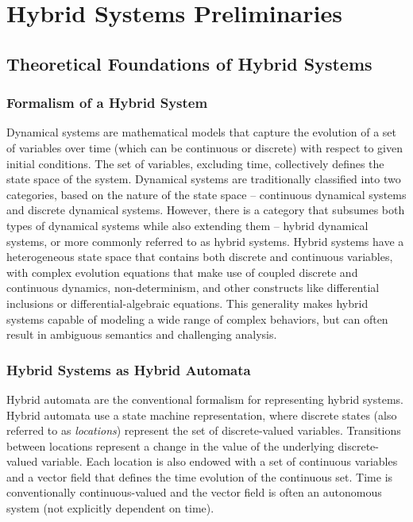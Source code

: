 \chapter{Hybrid Systems Preliminaries}\label{chap:hybrid}

\section{Theoretical Foundations of Hybrid Systems}

\subsection{Formalism of a Hybrid System}

Dynamical systems are mathematical models that capture the evolution of a set of variables over time (which can be continuous or discrete) with respect to given initial conditions. The set of variables, excluding time, collectively defines the state space of the system. Dynamical systems are traditionally classified into two categories, based on the nature of the state space -- continuous dynamical systems and discrete dynamical systems. However, there is a category that subsumes both types of dynamical systems while also extending them -- hybrid dynamical systems, or more commonly referred to as hybrid systems.
Hybrid systems have a heterogeneous state space that contains both discrete and continuous variables, with complex evolution equations that make use of coupled discrete and continuous dynamics, non-determinism, and other constructs like differential inclusions or differential-algebraic equations. This generality makes hybrid systems capable of modeling a wide range of complex behaviors, but can often result in ambiguous semantics and challenging analysis. 

\subsection{Hybrid Systems as Hybrid Automata}

Hybrid automata are the conventional formalism for representing hybrid systems. Hybrid automata use a  state machine representation, where discrete states (also referred to as \textit{locations}) represent the set of discrete-valued variables. Transitions between locations represent a change in the value of the underlying discrete-valued variable. Each location is also endowed with a set of continuous variables and a vector field that defines the time evolution of the continuous set. Time is conventionally continuous-valued and the vector field is often an autonomous system (not explicitly dependent on time).

